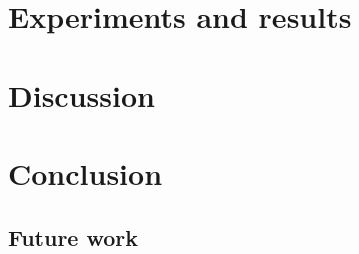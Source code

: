 \documentclass[a4paper]{report}
\begin{document}
\chapter{Experiments and results}
\chapter{Discussion}

\chapter{Conclusion}
\section{Future work}

\newpage


\end{document}
